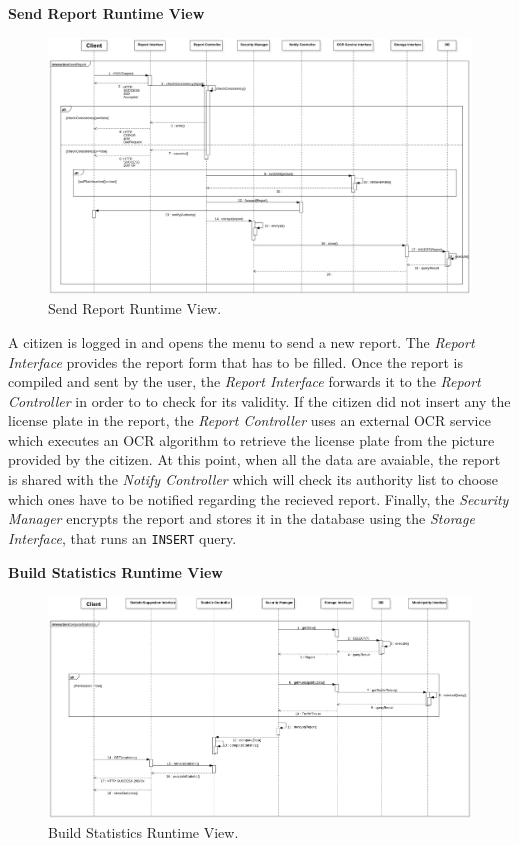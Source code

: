 \documentclass{report}
\begin{document}
\begin{center}\large{\textbf{Send Report Runtime View}}\end{center}
\begin{figure}[H]
	\begin{center}
	\includegraphics[width=\textwidth]{img/SendReport1.png}
    \end{center}
    \label{fig:SendReportSD}
	\caption{Send Report Runtime View.}
\end{figure}
A citizen is logged in and opens the menu to send a new report. The \textit{Report Interface} provides the report form that has to be filled. Once the report is compiled and sent by the user, the \textit{Report Interface} forwards it to the \textit{Report Controller} in order to to check for its validity. 
If the citizen did not insert any the license plate in the report, the \textit{Report Controller} uses an external OCR service which executes an OCR algorithm to retrieve the license plate from the picture provided by the citizen.
At this point, when all the data are avaiable, the report is shared with the \textit{Notify Controller} which will check its authority list to choose which ones have to be notified regarding the recieved report.
Finally, the \textit{Security Manager} encrypts the report and stores it in the database using the \textit{Storage Interface}, that runs an \texttt{INSERT} query. 
\clearpage
\begin{center}\large{\textbf{Build Statistics Runtime View}}\end{center}
\begin{figure}[H]
	\begin{center}
	\includegraphics[width=.9\textwidth]{img/ComputeStatistics.png}
    \end{center}
    \label{fig:ComputeStatisticSD}
	\caption{Build Statistics Runtime View.}
\end{figure}
\end{document}
